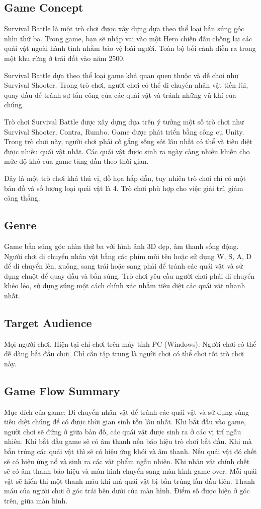 \documentclass[../report.tex]{subfiles}
\begin{document}
\subsection{Game Concept}

Survival Battle là một trò chơi được xây dựng 
dựa theo thể loại bắn súng góc nhìn thứ ba.
Trong game, bạn sẽ nhập vai vào một Hero chiến đấu chống lại các quái
vật ngoài hành tình nhằm bảo vệ loài người.
Toàn bộ bối cảnh diễn ra trong một khu rừng ở trái đất vào năm 2500. 

Survival Battle dựa theo thể loại game khá quan quen
thuộc và dễ chơi như Survival Shooter. Trong trò chơi, người
chơi có thể  di chuyển nhân vật tiến lùi, quay đầu để tránh
sự tấn công của các quái vật và tránh những vũ khí của chúng. 

Trò chơi Survival Battle được xây dựng dựa trên ý tưởng
một số trò chơi như Survival Shooter, Contra, Rumbo. Game được
phát triển bằng công cụ Unity. Trong trò chơi này, người chơi
phải cố gắng sống sót lâu nhất có thể và tiêu diệt được nhiều quái vật nhất.
Các quái vật được sinh ra ngày càng nhiều khiến
cho mức độ khó của game tăng dần theo thời gian. 

Đây là một trò chơi khá thú vị, đồ họa hấp dẫn,
tuy nhiên trò chơi chỉ có một bản đồ và số
lượng loại quái vật là 4. Trò chơi phù hợp cho
việc giải trí, giảm căng thẳng. 

\subsection{Genre}
Game bắn súng góc nhìn thứ ba với hình ảnh 3D đẹp,
âm thanh sống động. Người chơi di chuyển nhân vật bằng các
phím mũi tên hoặc sử dụng W, S, A, D để di chuyển lên, xuống,
sang trái hoặc sang phải để tránh các quái vật và sử dụng
chuột để quay đầu và bắn súng. Trò chơi yêu cầu người chơi phải
di chuyển khéo léo, sử dụng súng một cách chính xác
nhằm tiêu diệt các quái vật nhanh nhất.

\subsection{Target Audience}
Mọi người chơi. Hiện tại chỉ chơi trên máy tính PC (Windows).
Người chơi có thể dễ dàng bắt đầu chơi.
Chỉ cần tập trung là người chơi có thể chơi tốt trò chơi này. 

\subsection{Game Flow Summary}
Mục đích của game: Di chuyển nhân vật để tránh các quái vật
và sử dụng súng tiêu diệt chúng để có được thời gian
sinh tồn lâu nhất. Khi bắt đầu vào game,
người chơi sẽ đứng ở giữa bản đồ, các quái
vật được sinh ra ở các vị trí ngẫu nhiên. Khi bắt
đầu game sẽ có âm thanh nền báo hiệu trò chơi bắt đầu.
Khi mà bắn trúng các quái vật thì sẽ có hiệu ứng khói và âm thanh.
Nếu quái vật đó chết sẽ có hiệu ứng nổ và sinh ra các vật phẩm ngẫu nhiên. 
Khi nhân vật chính chết sẽ có âm thanh báo hiệu và
màn hình chuyển sang màn hình game over. Mỗi quái vật
sẽ hiển thị một thanh máu khi mà quái vật bị bắn trúng lần đầu tiên.
Thanh máu của người chơi ở góc trái bên dưới của màn hình.
Điểm số được hiện ở góc trên, giữa màn hình.
\end{document}
